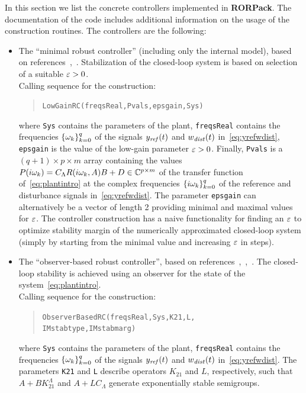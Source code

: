 \documentclass[11pt, a4paper]{amsart}
\newcommand{\CL}{C_\Lambda}
\theoremstyle{definition}
\numberwithin{equation}{section}
\newcommand{\yref}{y_{\mbox{\scriptsize\textit{ref}}}}
\newcommand{\wdist}{w_{\mbox{\scriptsize\textit{dist}}}}
\newcommand{\RORname}{\textbf{RORPack}}
\begin{document}
In this section we list the concrete controllers implemented in \RORname.
The documentation of the code includes additional information on the usage of the construction routines.
The controllers are the following:
\begin{itemize}
  \item The ``minimal robust controller'' (including only the internal model), based on references~\cite{HamPoh00},~. Stabilization of the closed-loop system is based on selection of a suitable  $\varepsilon>0$.\\[1ex]
      Calling sequence for the construction:\\[-1ex]
     \begin{quotation}
       \texttt{LowGainRC(freqsReal,Pvals,epsgain,Sys)}
     \end{quotation}
     \medskip
     where \texttt{Sys} contains the parameters of the plant, \texttt{freqsReal} contains the frequencies $\{\omega_k\}_{k=0}^q$ of the signals $\yref(t)$ and $\wdist(t)$ in~\eqref{eq:yrefwdist}, \texttt{epsgain} is the value of the low-gain parameter $\varepsilon>0$. Finally, \texttt{Pvals} is a $(q+1)\times p\times m$ array containing the values $P(i\gw_k)=\CL R(i\gw_k,A)B+D\in \C^{p\times m}$ of the transfer function of~\eqref{eq:plantintro} at the complex frequencies $\{i\omega_k\}_{k=0}^q$ of the reference and disturbance signals in~\eqref{eq:yrefwdist}.
     The parameter \texttt{epsgain} can alternatively be a vector of length 2 providing minimal and maximal values for $\varepsilon$. The controller construction has a naive functionality for finding an $\varepsilon$ to optimize stability margin of the numerically approximated closed-loop system (simply by starting from the minimal value and increasing $\varepsilon$ in steps). 

     \bigskip

  \item The ``observer-based robust controller'', based on references~,~,~. The closed-loop stability is achieved using an observer for the state of the system~\eqref{eq:plantintro}.\\[1ex]
      Calling sequence for the construction:\\[-1ex]
     \begin{quotation}
       \texttt{ObserverBasedRC(freqsReal,Sys,K21,L,\\ 
	 \phantom{a}\hspace{2.7cm} IMstabtype,IMstabmarg)}
     \end{quotation}
     \medskip
     where \texttt{Sys} contains the parameters of the plant, \texttt{freqsReal} contains the frequencies $\{\omega_k\}_{k=0}^q$ of the signals $\yref(t)$ and $\wdist(t)$ in~\eqref{eq:yrefwdist}.
     The parameters \texttt{K21} and \texttt{L} describe operators $K_{21}$ and $L$, respectively, such that $A+BK_{21}^\Lambda$ and $A+L\CL$ generate exponentially stable semigroups. 


\end{itemize}
\end{document}
